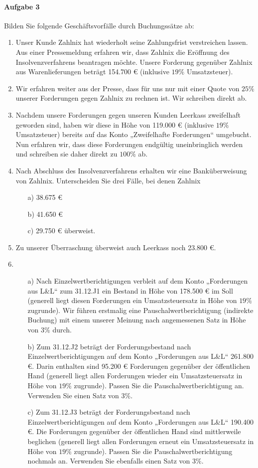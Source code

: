 \documentclass[paper=a4, fontsize=11pt]{scrartcl}
\numberwithin{equation}{section}
\numberwithin{figure}{section}
\numberwithin{table}{section}
\begin{document}
\paragraph{Aufgabe 3}
Bilden Sie folgende Geschäftsvorfälle durch Buchungssätze ab: \\
\begin{enumerate}
\item Unser Kunde Zahlnix hat wiederholt seine Zahlungsfrist verstreichen lassen. Aus einer Pressemeldung erfahren wir, dass Zahlnix die Eröffnung des Insolvenzverfahrens beantragen möchte. Unsere Forderung gegenüber Zahlnix aus Warenlieferungen beträgt 154.700 € (inklusive $19 \%$ Umsatzsteuer). 
\item Wir erfahren weiter aus der Presse, dass für uns nur mit einer Quote von $25 \%$ unserer Forderungen gegen Zahlnix zu rechnen ist. Wir schreiben direkt ab. 
\item Nachdem unsere Forderungen gegen unseren Kunden Leerkass zweifelhaft geworden sind, haben wir diese in Höhe von 119.000 € (inklusive $19 \%$ Umsatzsteuer) bereits auf das Konto „Zweifelhafte Forderungen“ umgebucht. Nun erfahren wir, dass diese Forderungen endgültig uneinbringlich werden und schreiben sie daher direkt zu $100 \%$ ab.
\item Nach Abschluss des Insolvenzverfahrens erhalten wir eine Banküberweisung von Zahlnix. Unterscheiden Sie drei Fälle, bei denen Zahlnix 
\begin{itemize}
\item[a)] 38.675 €
\item[b)] 41.650 €
\item[c)] 29.750 € überweist.
\end{itemize} 
\item Zu unserer Überraschung überweist auch Leerkass noch 23.800 €. 
\item 
\begin{itemize}
\item[a)] Nach Einzelwertberichtigungen verbleit auf dem Konto „Forderungen aus L\&L“ zum 31.12.J1 ein Bestand in Höhe von 178.500 € im Soll (generell liegt diesen Forderungen ein Umsatzsteuersatz in Höhe von $19 \%$ zugrunde). Wir führen erstmalig eine Pauschalwertberichtigung (indirekte Buchung) mit einem unserer Meinung nach angemessenen Satz in Höhe von $3 \%$ durch.
\item[b)] Zum 31.12.J2 beträgt der Forderungsbestand nach Einzelwertberichtigungen auf dem Konto „Forderungen aus L\&L“ 261.800 €. Darin enthalten sind 95.200 € Forderungen gegenüber der öffentlichen Hand (generell liegt allen Forderungen wieder ein Umsatzsteuersatz in Höhe von $19 \%$ zugrunde). Passen Sie die Pauschalwertberichtigung an. Verwenden Sie einen Satz von $3 \%$.
\item[c)] Zum 31.12.J3 beträgt der Forderungsbestand nach Einzelwertberichtigungen auf dem Konto „Forderungen aus L\&L“ 190.400 €. Die Forderungen gegenüber der öffentlichen Hand sind mittlerweile beglichen (generell liegt allen Forderungen erneut ein Umsatzsteuersatz in Höhe von $19 \%$ zugrunde). Passen Sie die Pauschalwertberichtigung nochmals an. Verwenden Sie ebenfalls einen Satz von $3 \%$. 
\end{itemize}  
\end{enumerate}
\end{document}
